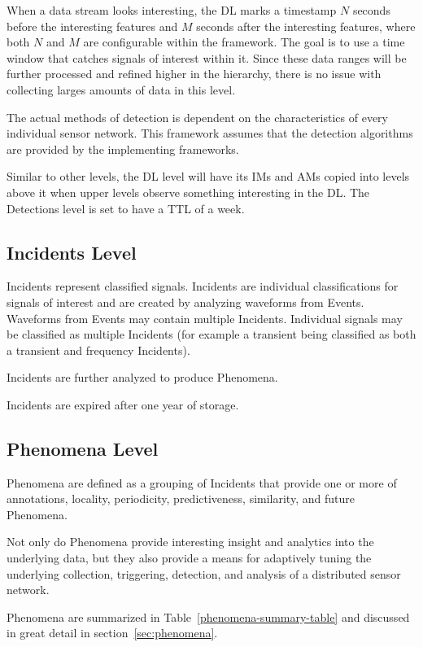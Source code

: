 When a data stream looks interesting, the DL marks a timestamp $N$ seconds before the interesting features and $M$ seconds after the interesting features, where both $N$ and $M$ are configurable within the framework. The goal is to use a time window that catches signals of interest within it. Since these data ranges will be further processed and refined higher in the hierarchy, there is no issue with collecting larges amounts of data in this level.

The actual methods of detection is dependent on the characteristics of every individual sensor network. This framework assumes that the detection algorithms are provided by the implementing frameworks.

Similar to other levels, the DL level will have its IMs and AMs copied into levels above it when upper levels observe something interesting in the DL. The Detections level is set to have a TTL of a week.

\subsection{Incidents Level}\label{subsec:incidents-level}
Incidents represent classified signals. Incidents are individual classifications for signals of interest and are created by analyzing waveforms from Events. Waveforms from Events may contain multiple Incidents. Individual signals may be classified as multiple Incidents (for example a transient being classified as both a transient and frequency Incidents).

Incidents are further analyzed to produce Phenomena.

Incidents are expired after one year of storage.


\subsection{Phenomena Level}\label{subsec:phenomena-level}
Phenomena are defined as a grouping of Incidents that provide one or more of annotations, locality, periodicity, predictiveness, similarity, and future Phenomena.

Not only do Phenomena provide interesting insight and analytics into the underlying data, but they also provide a means for adaptively tuning the underlying collection, triggering, detection, and analysis of a distributed sensor network.

Phenomena are summarized in Table~\ref{phenomena-summary-table} and discussed in great detail in section~\ref{sec:phenomena}.

